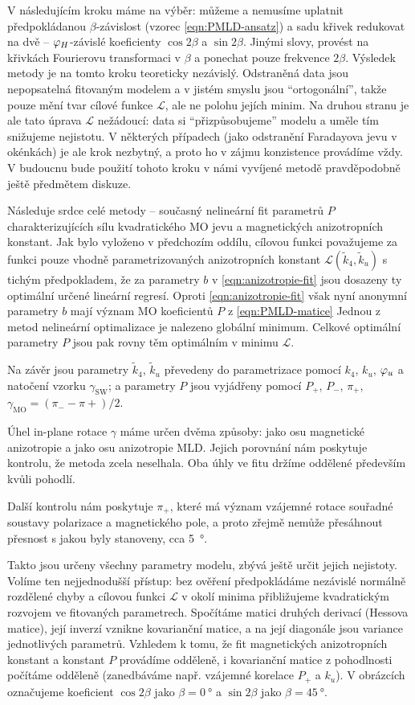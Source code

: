 V následujícím kroku máme na výběr: můžeme a nemusíme uplatnit předpokládanou $\beta$-závislost (vzorec \eqref{eqn:PMLD-ansatz}) a sadu křivek redukovat na dvě -- $\varphi_H$-závislé koeficienty $\cos2\beta$ a $\sin2\beta$.
Jinými slovy, provést na křivkách Fourierovu transformaci v $\beta$ a ponechat pouze frekvence $2\beta$.
Výsledek metody je na tomto kroku teoreticky nezávislý.
Odstraněná data jsou nepopsatelná fitovaným modelem a v jistém smyslu jsou ``ortogonální'', takže pouze mění tvar cílové funkce $\mathcal{L}$, ale ne polohu jejích minim.
Na druhou stranu je ale tato úprava $\mathcal{L}$ nežádoucí: data si ``přizpůsobujeme'' modelu a uměle tím snižujeme nejistotu.
V některých případech (jako odstranění Faradayova jevu v okénkách) je ale krok nezbytný, a proto ho v zájmu konzistence provádíme vždy.
V budoucnu bude použití tohoto kroku v námi vyvíjené metodě pravděpodobně ještě předmětem diskuze.

Následuje srdce celé metody -- současný nelineární fit parametrů $P$ charakterizujících sílu kvadratického MO jevu a magnetických anizotropních konstant.
Jak bylo vyloženo v předchozím oddílu, cílovou funkci považujeme za funkci pouze vhodně parametrizovaných anizotropních konstant $\mathcal{L}(\tilde{k}_4, \tilde{k}_u)$ s tichým předpokladem, že za parametry $b$ v \eqref{eqn:anizotropie-fit} jsou dosazeny ty optimální určené lineární regresí.
Oproti \eqref{eqn:anizotropie-fit} však nyní anonymní parametry $b$ mají význam MO koeficientů $P$ z \eqref{eqn:PMLD-matice}
Jednou z metod nelineární optimalizace je nalezeno globální minimum.
Celkové optimální parametry $P$ jsou pak rovny těm optimálním v minimu $\mathcal{L}$.

Na závěr jsou parametry $\tilde{k}_4$, $\tilde{k}_u$ převedeny do parametrizace pomocí $k_4$, $k_u$, $\varphi_u$ a natočení vzorku $\gamma_\textrm{SW}$; a parametry $P$ jsou vyjádřeny pomocí $P_+$, $P_-$, $\pi_+$, $\gamma_\textrm{MO}=(\pi_--\pi+)/2$.

Úhel in-plane rotace $\gamma$ máme určen dvěma způsoby: jako osu magnetické anizotropie a jako osu anizotropie MLD.
Jejich porovnání nám poskytuje kontrolu, že metoda zcela neselhala.
Oba úhly ve fitu držíme oddělené především kvůli pohodlí.

Další kontrolu nám poskytuje $\pi_+$, které má význam vzájemné rotace souřadné soustavy polarizace a magnetického pole, a proto zřejmě nemůže přesáhnout přesnost s jakou byly stanoveny, cca \SI{5}{\degree}.

Takto jsou určeny všechny parametry modelu, zbývá ještě určit jejich nejistoty.
Volíme ten nejjednodušší přístup: bez ověření předpokládáme nezávislé normálně rozdělené chyby a cílovou funkci $\mathcal{L}$ v okolí minima přibližujeme kvadratickým rozvojem ve fitovaných parametrech.
Spočítáme matici druhých derivací (Hessova matice), její inverzí vznikne kovarianční matice, a na její diagonále jsou variance jednotlivých parametrů.
Vzhledem k tomu, že fit magnetických anizotropních konstant a konstant $P$ provádíme odděleně, i kovarianční matice z pohodlnosti počítáme odděleně (zanedbáváme např. vzájemné korelace $P_+$ a $k_u$).
V obrázcích označujeme koeficient $\cos2\beta$ jako $\beta=\SI{0}{\degree}$ a $\sin2\beta$ jako $\beta=\SI{45}{\degree}$.

